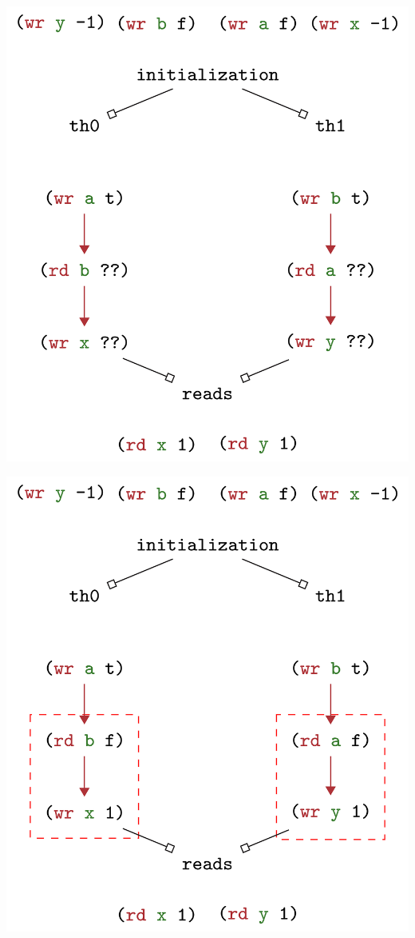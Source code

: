 \documentclass[aspectratio=1610, xcolor={dvipsnames}]{beamer}
\begin{document}
\begin{frame}
    \centering
    
    \includegraphics[height=0.9\textheight]{fig/trace5-11-2.jpg}

\end{frame}

\begin{frame}
    \centering
    
    \includegraphics[height=0.9\textheight]{fig/trace5-11-3.jpg}

\end{frame}
\end{document}
